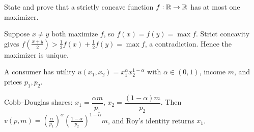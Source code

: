 %

\begin{questions}

\question[10]
State and prove that a strictly concave function \(f:\mathbb{R}\to\mathbb{R}\) has at most one
maximizer.
\begin{solution}
Suppose \(x \ne y\) both maximize \(f\), so \(f(x) = f(y) = \max f\). Strict
concavity gives \(f\!\left(\tfrac{x+y}{2}\right) > \tfrac12 f(x) + \tfrac12 f(y)
= \max f\), a contradiction. Hence the maximizer is unique.
\end{solution}

\question[15]
A consumer has utility \(u(x_1,x_2) = x_1^{\alpha} x_2^{1-\alpha}\) with
\(\alpha \in (0,1)\), income \(m\), and prices \(p_1,p_2\).
\begin{solution}
Cobb--Douglas shares: \(x_1 = \dfrac{\alpha m}{p_1}\), \(x_2 = \dfrac{(1-\alpha)m}{p_2}\).
Then \(v(p,m) = \left(\tfrac{\alpha}{p_1}\right)^{\alpha}
\left(\tfrac{1-\alpha}{p_2}\right)^{1-\alpha} m\), and Roy's identity returns \(x_1\).
\end{solution}

\end{questions}
